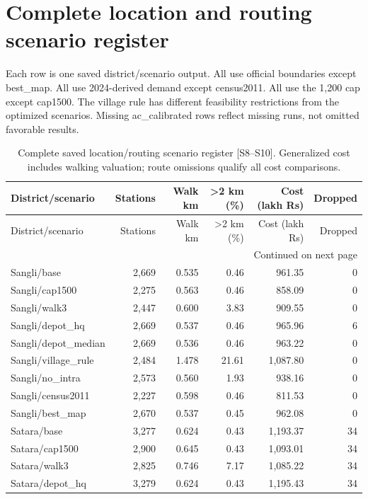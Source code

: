 \documentclass[11pt,a4paper,oneside]{report}
\begin{document}
\chapter{Complete location and routing scenario register}\label{app:scenarios}
Each row is one saved district/scenario output. All use official boundaries except best\_map. All use 2024-derived demand except census2011. All use the 1,200 cap except cap1500. The village rule has different feasibility restrictions from the optimized scenarios. Missing ac\_calibrated rows reflect missing runs, not omitted favorable results.
\begin{center}
\small
\setlength{\tabcolsep}{5pt}
\begin{longtable}{p{4.5cm}rrrrr}
\caption{Complete saved location/routing scenario register [S8--S10]. Generalized cost includes walking valuation; route omissions qualify all cost comparisons.}\\
\toprule
District/scenario & Stations & Walk km & >2 km (\%) & Cost (lakh Rs) & Dropped\\
\midrule\endfirsthead
\toprule
District/scenario & Stations & Walk km & >2 km (\%) & Cost (lakh Rs) & Dropped\\
\midrule\endhead
\midrule\multicolumn{6}{r}{\footnotesize Continued on next page}\\\endfoot
\bottomrule\endlastfoot
Sangli/base & 2,669 & 0.535 & 0.46 & 961.35 & 0\\
Sangli/cap1500 & 2,275 & 0.563 & 0.46 & 858.09 & 0\\
Sangli/walk3 & 2,447 & 0.600 & 3.83 & 909.55 & 0\\
Sangli/depot\_hq & 2,669 & 0.537 & 0.46 & 965.96 & 6\\
Sangli/depot\_median & 2,669 & 0.536 & 0.46 & 963.22 & 0\\
Sangli/village\_rule & 2,484 & 1.478 & 21.61 & 1,087.80 & 0\\
Sangli/no\_intra & 2,573 & 0.560 & 1.93 & 938.16 & 0\\
Sangli/census2011 & 2,227 & 0.598 & 0.46 & 811.53 & 0\\
Sangli/best\_map & 2,670 & 0.537 & 0.45 & 962.08 & 0\\
Satara/base & 3,277 & 0.624 & 0.43 & 1,193.37 & 34\\
Satara/cap1500 & 2,900 & 0.645 & 0.43 & 1,093.01 & 34\\
Satara/walk3 & 2,825 & 0.746 & 7.17 & 1,085.22 & 34\\
Satara/depot\_hq & 3,279 & 0.624 & 0.43 & 1,195.43 & 34\\

\end{longtable}
\end{center}
\end{document}
